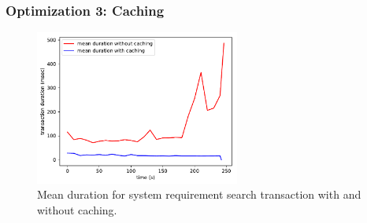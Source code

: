 \begin{frame}
\frametitle{Optimization 3: Caching}
\begin{figure}
	\centering
	\includegraphics[width=0.6\textwidth, height=0.6\textheight]{images/caching}
	\caption{Mean duration for system requirement search transaction with and without caching.}\label{fig:caching}
\end{figure}
\end{frame}
